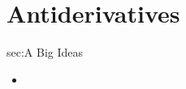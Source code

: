 \chapter{Antiderivatives}
\label{chap:A}

\begin{bigideas}{sec:A Big Ideas}
\begin{itemize}
  \item 
\end{itemize}
\end{bigideas}